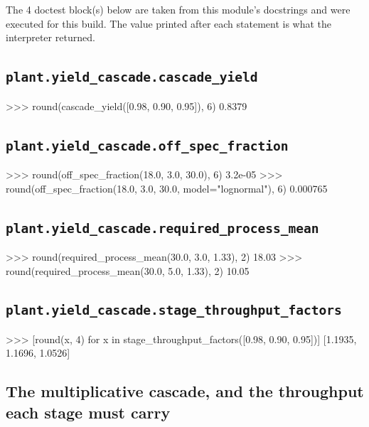 \documentclass[10pt,a4paper,twoside]{report}
\begin{document}
The 4 doctest block(s) below are taken from this module's docstrings and were executed for this build. The value printed after each statement is what the interpreter returned.

\subsection*{\texttt{plant.yield\_cascade.cascade\_yield}}

\begin{doctestblock}
>>> round(cascade_yield([0.98, 0.90, 0.95]), 6)
0.8379
\end{doctestblock}

\subsection*{\texttt{plant.yield\_cascade.off\_spec\_fraction}}

\begin{doctestblock}
>>> round(off_spec_fraction(18.0, 3.0, 30.0), 6)
3.2e-05
>>> round(off_spec_fraction(18.0, 3.0, 30.0, model="lognormal"), 6)
0.000765
\end{doctestblock}

\subsection*{\texttt{plant.yield\_cascade.required\_process\_mean}}

\begin{doctestblock}
>>> round(required_process_mean(30.0, 3.0, 1.33), 2)
18.03
>>> round(required_process_mean(30.0, 5.0, 1.33), 2)
10.05
\end{doctestblock}

\subsection*{\texttt{plant.yield\_cascade.stage\_throughput\_factors}}

\begin{doctestblock}
>>> [round(x, 4) for x in stage_throughput_factors([0.98, 0.90, 0.95])]
[1.1935, 1.1696, 1.0526]
\end{doctestblock}

\subsection*{The multiplicative cascade, and the throughput each stage must carry}
\end{document}
